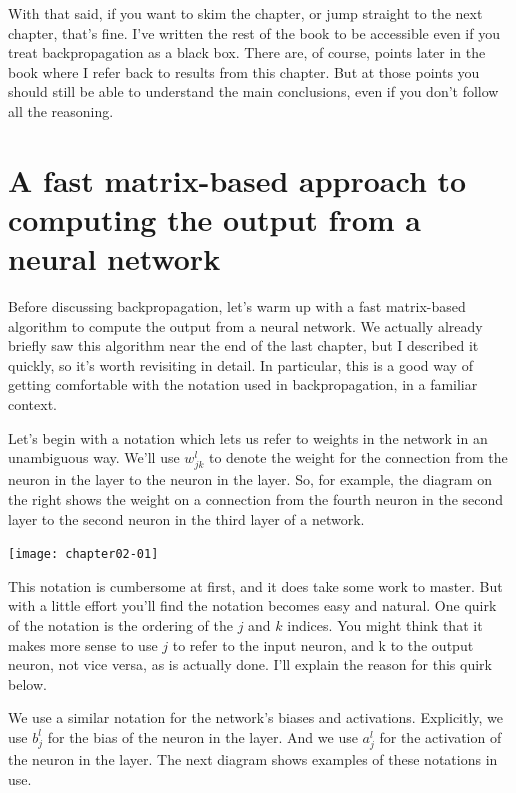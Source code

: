 With that said, if you want to skim the chapter, or jump straight to the next chapter, that's fine. I've written the rest of the book to be accessible even if you treat backpropagation as a black box. There are, of course, points later in the book where I refer back to results from this chapter. But at those points you should still be able to understand the main conclusions, even if you don't follow all the reasoning.

\section{A fast matrix-based approach to computing the output from a neural network}

Before discussing backpropagation, let's warm up with a fast matrix-based algorithm to compute the output from a neural network. We actually already briefly saw this algorithm near the end of the last chapter, but I described it quickly, so it's worth revisiting in detail. In particular, this is a good way of getting comfortable with the notation used in backpropagation, in a familiar context.

Let's begin with a notation which lets us refer to weights in the network in an unambiguous way. We'll use $w^l_{jk}$ to denote the weight for the connection from the  neuron in the  layer to the  neuron in the  layer. So, for example, the diagram on the right shows the weight on a connection from the fourth neuron in the second layer to the second neuron in the third layer of a network.

\begin{marginfigure}
\texttt{[image: chapter02-01]}
\end{marginfigure}

This notation is cumbersome at first, and it does take some work to master. But with a little effort you'll find the notation becomes easy and natural. One quirk of the notation is the ordering of the $j$ and $k$ indices. You might think that it makes more sense to use $j$ to refer to the input neuron, and k to the output neuron, not vice versa, as is actually done. I'll explain the reason for this quirk below.


We use a similar notation for the network's biases and activations. Explicitly, we use $b^l_j$ for the bias of the  neuron in the  layer. And we use $a^l_j$ for the activation of the  neuron in the  layer. The next diagram shows examples of these notations in use.


